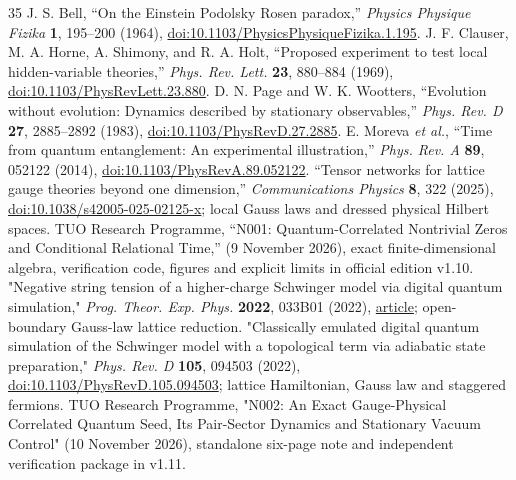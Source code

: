 \documentclass[11pt,a4paper]{article}
\theoremstyle{tmon}
\theoremstyle{definition}
\begin{document}
\begin{thebibliography}{35}
 J. S. Bell, ``On the Einstein Podolsky Rosen paradox,'' \emph{Physics Physique Fizika} \textbf{1}, 195--200 (1964), \href{https://doi.org/10.1103/PhysicsPhysiqueFizika.1.195}{doi:10.1103/PhysicsPhysiqueFizika.1.195}.
 J. F. Clauser, M. A. Horne, A. Shimony, and R. A. Holt, ``Proposed experiment to test local hidden-variable theories,'' \emph{Phys. Rev. Lett.} \textbf{23}, 880--884 (1969), \href{https://doi.org/10.1103/PhysRevLett.23.880}{doi:10.1103/PhysRevLett.23.880}.
 D. N. Page and W. K. Wootters, ``Evolution without evolution: Dynamics described by stationary observables,'' \emph{Phys. Rev. D} \textbf{27}, 2885--2892 (1983), \href{https://doi.org/10.1103/PhysRevD.27.2885}{doi:10.1103/PhysRevD.27.2885}.
 E. Moreva \emph{et al.}, ``Time from quantum entanglement: An experimental illustration,'' \emph{Phys. Rev. A} \textbf{89}, 052122 (2014), \href{https://doi.org/10.1103/PhysRevA.89.052122}{doi:10.1103/PhysRevA.89.052122}.
 ``Tensor networks for lattice gauge theories beyond one dimension,'' \emph{Communications Physics} \textbf{8}, 322 (2025), \href{https://doi.org/10.1038/s42005-025-02125-x}{doi:10.1038/s42005-025-02125-x}; local Gauss laws and dressed physical Hilbert spaces.
 TUO Research Programme, ``N001: Quantum-Correlated Nontrivial Zeros and Conditional Relational Time,'' (9 November 2026), exact finite-dimensional algebra, verification code, figures and explicit limits in official edition v1.10.
 "Negative string tension of a higher-charge Schwinger model via digital quantum simulation," \emph{Prog. Theor. Exp. Phys.} \textbf{2022}, 033B01 (2022), \href{https://academic.oup.com/ptep/article/2022/3/033B01/6507570}{article}; open-boundary Gauss-law lattice reduction.
 "Classically emulated digital quantum simulation of the Schwinger model with a topological term via adiabatic state preparation," \emph{Phys. Rev. D} \textbf{105}, 094503 (2022), \href{https://doi.org/10.1103/PhysRevD.105.094503}{doi:10.1103/PhysRevD.105.094503}; lattice Hamiltonian, Gauss law and staggered fermions.
 TUO Research Programme, "N002: An Exact Gauge-Physical Correlated Quantum Seed, Its Pair-Sector Dynamics and Stationary Vacuum Control" (10 November 2026), standalone six-page note and independent verification package in v1.11.


\end{thebibliography}
\end{document}
